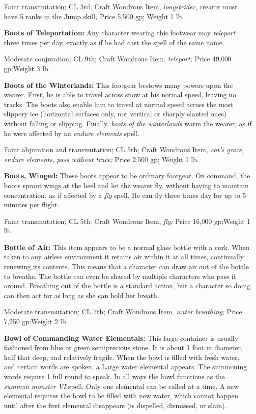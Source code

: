 \documentclass{article}
\begin{document}
Faint transmutation; CL 3rd; Craft Wondrous Item, \textit{longstrider}, creator 
must have 5 ranks in the Jump skill\textit{; }Price 5,500 gp; Weight 1 lb.

\textbf{Boots of Teleportation:} Any character wearing this footwear may \textit{teleport 
}three times per day, exactly as if he had cast the spell of the same name.

Moderate conjuration; CL 9th; Craft Wondrous Item, \textit{teleport; }Price 49,000 
gp;Weight 3 lb.

\textbf{Boots of the Winterlands:} This footgear bestows many powers upon the wearer. 
First, he is able to travel across snow at his normal speed, leaving no tracks. 
The boots also enable him to travel at normal speed across the most slippery ice 
(horizontal surfaces only, not vertical or sharply slanted ones) without falling 
or slipping. Finally, \textit{boots of the winterlands }warm the wearer, as if 
he were affected by an \textit{endure elements }spell.

Faint abjuration and transmutation; CL 5th; Craft Wondrous Item\textit{, cat's 
grace, endure elements, pass without trace; }Price 2,500 gp; Weight 1 lb.

\textbf{Boots, Winged:} These boots appear to be ordinary footgear. On command, 
the boots sprout wings at the heel and let the wearer fly, without having to maintain 
concentration, as if affected by a \textit{fly }spell. He can fly three times day 
for up to 5 minutes per flight.

Faint transmutation; CL 5th; Craft Wondrous Item, \textit{fly; }Price 16,000 gp;Weight 
1 lb.

\textbf{Bottle of Air:} This item appears to be a normal glass bottle with a cork. 
When taken to any airless environment it retains air within it at all times, continually 
renewing its contents. This means that a character can draw air out of the bottle 
to breathe. The bottle can even be shared by multiple characters who pass it around. 
Breathing out of the bottle is a standard action, but a character so doing can 
then act for as long as she can hold her breath.

Moderate transmutation; CL 7th; Craft Wondrous Item, \textit{water breathing; }Price 
7,250 gp;Weight 2 lb.

\textbf{Bowl of Commanding Water Elementals:} This large container is usually fashioned 
from blue or green semiprecious stone. It is about 1 foot in diameter, half that 
deep, and relatively fragile. When the bowl is filled with fresh water, and certain 
words are spoken, a Large water elemental appears. The summoning words require 
1 full round to speak. In all ways the bowl functions as the \textit{summon monster 
VI }spell. Only one elemental can be called at a time. A new elemental requires 
the bowl to be filled with new water, which cannot happen until after the first 
elemental disappears (is dispelled, dismissed, or slain).
\end{document}
